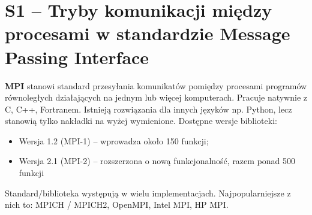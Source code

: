 \section{S1 -- Tryby komunikacji między procesami w standardzie Message Passing Interface}

\textbf{MPI} stanowi standard przesyłania komunikatów pomiędzy procesami programów równoległych działających na jednym lub więcej komputerach. Pracuje natywnie z C, C++, Fortranem. Istnieją rozwiązania dla innych języków np. Python, lecz stanowią tylko nakładki na wyżej wymienione. Dostępne wersje biblioteki:
\begin{itemize}
\item Wersja 1.2 (MPI-1) -- wprowadza około 150 funkcji;
\item Wersja 2.1 (MPI-2) -- rozszerzona o nową funkcjonalność, razem ponad 500 funkcji
\end{itemize}

Standard/biblioteka występują w wielu implementacjach. Najpopularniejsze z nich to: MPICH / MPICH2, OpenMPI, Intel MPI, HP MPI. 

